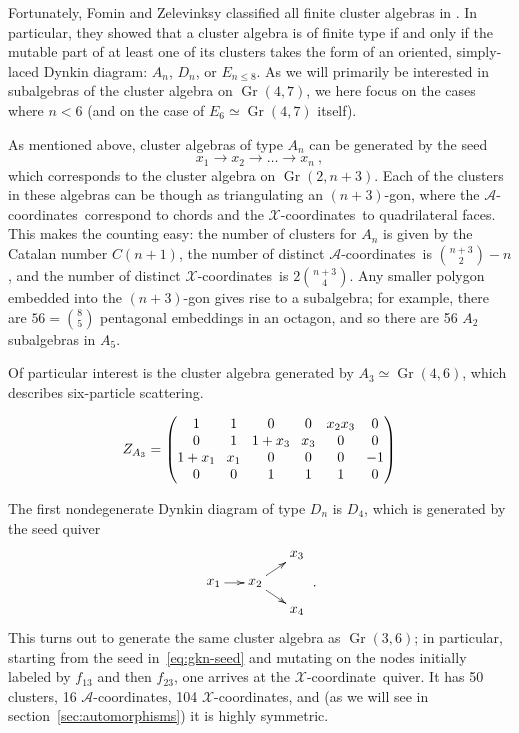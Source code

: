 \documentclass[11pt]{article}
\DeclareMathOperator{\Gr}{Gr}
\def\xcoord{$\mathcal{X}$-coordinate}
\def\xcoords{$\mathcal{X}$-coordinates}
\def\acoords{$\mathcal{A}$-coordinates}
\begin{document}
Fortunately, Fomin and Zelevinksy classified all finite cluster algebras in \cite{1054.17024}. In particular, they showed that a cluster algebra is of finite type if and only if the mutable part of at least one of its clusters takes the form of an oriented, simply-laced Dynkin diagram: $A_n$, $D_n$, or $E_{n\le8}$.  As we will primarily be interested in subalgebras of the cluster algebra on $\Gr(4,7)$, we here focus on the cases where $n < 6$ (and on the case of $E_6 \simeq \Gr(4,7)$ itself). 

As mentioned above, cluster algebras of type $A_n$ can be generated by the seed
\begin{equation}\label{def:An}
  x_1\to x_2\to \ldots \to x_n \ ,
\end{equation}
which corresponds to the cluster algebra on $\Gr(2,n{+}3)$. Each of the clusters in these algebras can be though as triangulating an $(n+3)$-gon, where the \acoords\ correspond to chords and the \xcoords\ to quadrilateral faces. This makes the counting easy: the number of clusters for $A_n$ is given by the Catalan number $C(n+1)$, the number of distinct \acoords\ is $\binom{n+3}{2}-n$, and the number of distinct \xcoords\ is $2\binom{n+3}{4}$. Any smaller polygon embedded into the $(n+3)$-gon gives rise to a subalgebra; for example, there are $56=\binom{8}{5}$ pentagonal embeddings in an octagon, and so there are 56 $A_2$ subalgebras in $A_5$. 

Of particular interest is the cluster algebra generated by $A_3 \simeq \Gr(4,6)$, which describes six-particle scattering.

\begin{equation}
Z_{A_3} = 
\begingroup
\setlength\arraycolsep{4pt}
\begin{pmatrix} 
1 & 1 & 0 & 0 & x_2 x_3 & 0 \\
0 & 1 & 1+x_3 & x_3 & 0 & 0 \\
1+x_1 & x_1 & 0 & 0 & 0 & -1 \\
0 & 0 & 1 & 1 & 1 & 0
\end{pmatrix}
\endgroup
\end{equation}


The first nondegenerate Dynkin diagram of type $D_n$ is $D_4$, which is generated by the seed quiver
\begin{equation}\label{def:D4}
    \begin{gathered}
    \begin{xy} 0;<1pt,0pt>:<0pt,-1pt>::
      (0,20) *+{x_1} ="1",
      (30,20) *+{x_2} ="2",
      (60,0) *+{x_3} ="3",
      (60,40) *+{x_4} ="4",
      "1", {\ar"2"},
      "2", {\ar"3"},
      "2", {\ar"4"},
    \end{xy}
    \end{gathered} \ .
\end{equation}
This turns out to generate the same cluster algebra as $\Gr(3,6)$; in particular, starting from the seed in~\eqref{eq:gkn-seed} and mutating on the nodes initially labeled by $f_{13}$ and then $f_{23}$, one arrives at the \xcoord\ quiver. It has 50 clusters, 16 \acoords, 104 \xcoords, and (as we will see in section~\ref{sec:automorphisms}) it is highly symmetric. 
\end{document}

